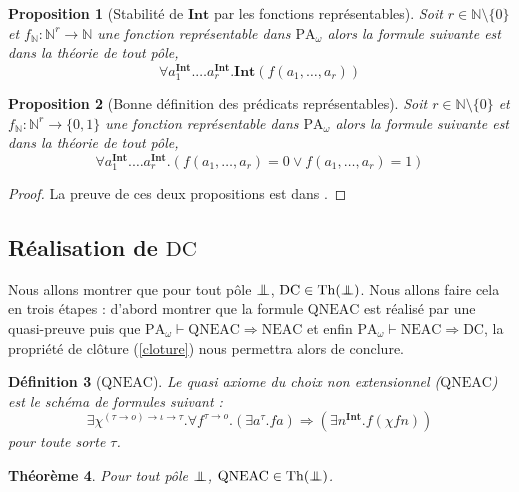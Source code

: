 \documentclass[a4paper,12pt]{article}
\newtheorem{theo}{Théorème}[subsection]
\newtheorem{prop}[theo]{Proposition}
\newtheorem{defi}[theo]{Définition}
\theoremstyle{rmqstyle}
\newcommand{\N}{\mathbb{N}}
\newcommand{\set}[1]{\{#1\}}
\newcommand{\PA}{\mathrm{PA}}
\renewcommand{\int}{\mathbf{Int}}
\renewcommand{\implies}{\Rightarrow}
\newcommand{\pole}{{\protect\mathpalette{\protect\polehelper}{\bot}}} \def\polehelper#1#2{\mathrel{\rlap{$#1#2$}\mkern3mu{#1#2}}}
\newcommand{\Th}{\mathrm{Th}}
\newcommand{\QNEAC}{\mathrm{QNEAC}}
\newcommand{\NEAC}{\mathrm{NEAC}}
\newcommand{\DC}{\mathrm{DC}}
\begin{document}
\begin{prop}[Stabilité de $\int$ par les fonctions représentables]
Soit $r \in \N \setminus \set{0}$ et $f_\N : \N^r \to \N$ une fonction représentable dans $\PA_\omega$ alors la formule suivante est dans la théorie de tout pôle,
$$\forall a_1^\int. \dots a_r^\int. \int(f(a_1, \dots, a_r))$$
\end{prop}

\begin{prop}[Bonne définition des prédicats représentables]
Soit $r \in \N \setminus \set{0}$ et $f_\N : \N^r \to \set{0,1}$ une fonction représentable dans $\PA_\omega$ alors la formule suivante est dans la théorie de tout pôle,
$$\forall a_1^\int. \dots a_r^\int. (f(a_1, \dots, a_r) = 0 \lor f(a_1, \dots, a_r) = 1)$$
\end{prop}

\begin{proof}
La preuve de ces deux propositions est dans \cite{KrivineRC}.
\end{proof}

\clearpage
\subsection{Réalisation de \( \DC \)}

Nous allons montrer que pour tout pôle $\pole$, $\DC \in \Th(\pole)$. Nous allons faire cela en trois étapes : d'abord montrer que la formule $\QNEAC$ est réalisé par une quasi-preuve puis que $\PA_\omega \vdash \QNEAC \implies \NEAC$ et enfin $\PA_\omega \vdash \NEAC\implies \DC$, la propriété de clôture (\ref{cloture}) nous permettra alors de conclure. 

\begin{defi}[$\QNEAC$]
Le quasi axiome du choix non extensionnel ($\QNEAC$) est le schéma de formules suivant :
$$\exists \chi^{(\tau \to o) \to \iota \to \tau}. \forall f^{\tau \to o}. (\exists a^\tau. fa) \implies (\exists n^\int. f(\chi f n))$$
pour toute sorte $\tau$. 
\end{defi}

\begin{theo}
\label{QNEAC}
Pour tout pôle $\pole$, $\QNEAC \in \Th(\pole)$.
\end{theo}
\end{document}
